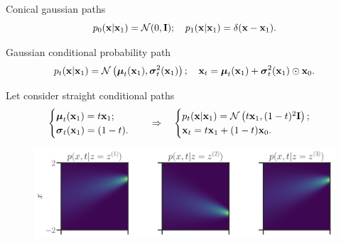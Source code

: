 \begin{frame}{Conical gaussian paths}
	\[
		p_0(\mathbf{x} | \mathbf{x}_1) = \mathcal{N}(0, \mathbf{I}); \quad p_1(\mathbf{x} | \mathbf{x}_1) = \delta(\mathbf{x} - \mathbf{x}_1).
	\]
	
	\begin{block}{Gaussian conditional probability path}
		\vspace{-0.5cm}
		\[
			p_t(\mathbf{x} | \mathbf{x}_1) = \mathcal{N}\left(\boldsymbol{\mu}_t(\mathbf{x}_1), \boldsymbol{\sigma}_t^2(\mathbf{x}_1)\right); \quad \mathbf{x}_t = \boldsymbol{\mu}_t(\mathbf{x}_1) +  \boldsymbol{\sigma}_t^2(\mathbf{x}_1) \odot \mathbf{x}_0.
		\]
		\vspace{-0.6cm}
	\end{block}
	Let consider straight conditional paths	
	\[
		\begin{cases}
			\boldsymbol{\mu}_t(\mathbf{x}_1) = t \mathbf{x}_1; \\
			\boldsymbol{\sigma}_t(\mathbf{x}_1) = (1 - t).
		\end{cases}
		\quad \Rightarrow \quad 
		\begin{cases}
			p_t(\mathbf{x} | \mathbf{x}_1) = \mathcal{N}\left(t \mathbf{x}_1, (1-t)^2 \mathbf{I}\right); \\
		 	\mathbf{x}_t = t \mathbf{x}_1 + (1 - t) \mathbf{x}_0. 
	 \end{cases}
	\]
	\vspace{-0.3cm}
	\begin{figure}
		\centering
		\includegraphics[width=\linewidth]{figs/conical_paths}
	\end{figure}
\end{frame}
